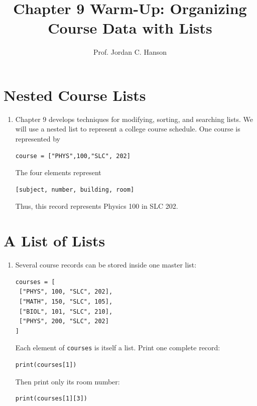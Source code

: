 \documentclass{article}
\begin{document}
\twocolumn

\title{Chapter 9 Warm-Up: Organizing Course Data with Lists}
\author{Prof. Jordan C. Hanson}
\date{}

\maketitle

\section{Nested Course Lists}

\begin{enumerate}

\item Chapter 9 develops techniques for modifying, sorting, and searching lists.  We will use a nested list to represent a college course schedule. One course is represented by

\begin{verbatim}
course = ["PHYS",100,"SLC", 202]
\end{verbatim}

The four elements represent

\begin{verbatim}
[subject, number, building, room]
\end{verbatim}

Thus, this record represents Physics 100 in SLC 202.

\end{enumerate}


\section{A List of Lists}

\begin{enumerate}

\item Several course records can be stored inside one master list:

\begin{verbatim}
courses = [
 ["PHYS", 100, "SLC", 202],
 ["MATH", 150, "SLC", 105],
 ["BIOL", 101, "SLC", 210],
 ["PHYS", 200, "SLC", 202]
]
\end{verbatim}

Each element of \texttt{courses} is itself a list.  Print one complete record:

\begin{verbatim}
print(courses[1])
\end{verbatim}

Then print only its room number:

\begin{verbatim}
print(courses[1][3])
\end{verbatim}

\end{enumerate}
\end{document}
